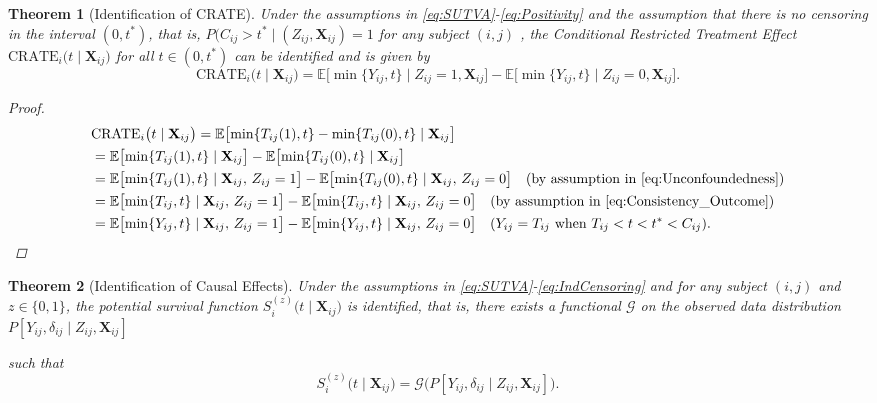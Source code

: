 \documentclass[aoas]{imsart}
\theoremstyle{plain}
\newtheorem{theorem}{Theorem}[section]
\theoremstyle{definition}
\begin{document}
\begin{theorem}[Identification of CRATE]
Under the assumptions in \eqref{eq:SUTVA}-\eqref{eq:Positivity} and the assumption that there is no censoring in the interval $(0,t^*)$, that is, $P(C_{ij}>t^* \mid (Z_{ij},\mathbf{X}_{ij})=1$ for any subject $(i,j)$ , the Conditional Restricted Treatment Effect $\text{CRATE}_i\bigl(t \mid \mathbf{X}_{ij}\bigr)$ for all $t \in (0,t^*)$ can be identified and is given by
\begin{equation}
\nonumber
 \text{CRATE}_i\bigl(t \mid \mathbf{X}_{ij}\bigr)= \mathbb{E}\bigl[\min\{Y_{ij}, t\} \mid Z_{ij}=1,\mathbf{X}_{ij}\bigr]-\mathbb{E}\bigl[\min\{Y_{ij}, t\} \mid Z_{ij}=0,\mathbf{X}_{ij}\bigr].
\end{equation}
\begin{proof}


\begin{align}
\nonumber &\text{CRATE}_i\bigl(t\mid \mathbf{X}_{ij}\bigr)
= \mathbb{E}\bigl[\min\{T_{ij}(1),t\}-\min\{T_{ij}(0),t\}\mid \mathbf{X}_{ij}\bigr]\\ \nonumber 
&= \mathbb{E}\bigl[\min\{T_{ij}(1),t\}\mid \mathbf{X}_{ij}\bigr]
 - \mathbb{E}\bigl[\min\{T_{ij}(0),t\}\mid \mathbf{X}_{ij}\bigr]\\ \nonumber 
&= \mathbb{E}\bigl[\min\{T_{ij}(1),t\}\mid \mathbf{X}_{ij},\,Z_{ij}=1\bigr]
 - \mathbb{E}\bigl[\min\{T_{ij}(0),t\}\mid \mathbf{X}_{ij},\,Z_{ij}=0\bigr] \quad (\text{by assumption in \eqref{eq:Unconfoundedness}}) \\ \nonumber 
&= \mathbb{E}\bigl[\min\{T_{ij},t\}\mid \mathbf{X}_{ij},\,Z_{ij}=1\bigr]
 - \mathbb{E}\bigl[\min\{T_{ij},t\}\mid \mathbf{X}_{ij},\,Z_{ij}=0\bigr] \quad (\text{by assumption in \eqref{eq:Consistency_Outcome}})\\ \nonumber 
&= \mathbb{E}\bigl[\min\{Y_{ij},t\}\mid \mathbf{X}_{ij},\,Z_{ij}=1\bigr]
 - \mathbb{E}\bigl[\min\{Y_{ij},t\}\mid \mathbf{X}_{ij},\,Z_{ij}=0\bigr] \quad (\text{$Y_{ij}=T_{ij}$ when $T_{ij} < t < t^* <C_{ij}$}).
\end{align}
    
\end{proof}
\noindent


\end{theorem}



\begin{theorem}[Identification of Causal Effects]
Under the assumptions in \eqref{eq:SUTVA}-\eqref{eq:IndCensoring} and for any subject $(i,j)$ and $z \in \{0,1\}$, the potential survival function $S_i^{(z)}\bigl(t \mid \mathbf{X}_{ij}\bigr)$ is identified, that is, there exists a functional \(\mathcal{G}\) on the observed data distribution $P[Y_{ij},\delta_{ij}\mid Z_{ij},\mathbf{X}_{ij}]$

\noindent such that
\begin{equation}
S_i^{(z)}\bigl(t \mid \mathbf{X}_{ij}\bigr)
= \mathcal{G}\bigl(P[Y_{ij},\delta_{ij}\mid Z_{ij},\mathbf{X}_{ij}]\bigr).
\end{equation}
\noindent
\end{theorem}
 
\end{document}
